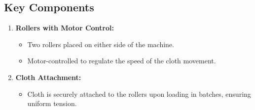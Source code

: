 \documentclass[table]{rapportCS}
\begin{document}
\subsection{Key Components}
\begin{enumerate}[label=\arabic*.]

    \item \textbf{Rollers with Motor Control:}
    \begin{itemize}[label=$\bullet$]
        \item Two rollers placed on either side of the machine.
        \item Motor-controlled to regulate the speed of the cloth movement.
    \end{itemize}

    \item \textbf{Cloth Attachment:}
    \begin{itemize}[label=$\bullet$]
        \item Cloth is securely attached to the rollers upon loading in batches, ensuring uniform tension.
    \end{itemize}


\end{enumerate}
\end{document}

